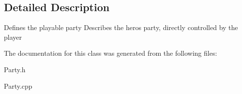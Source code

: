 \subsection{Detailed Description}
Defines the playable party Describes the hero\textquotesingle{}s party, directly controlled by the player 

The documentation for this class was generated from the following files\+:\begin{DoxyCompactItemize}
\item 
Party.\+h\item 
Party.\+cpp\end{DoxyCompactItemize}

